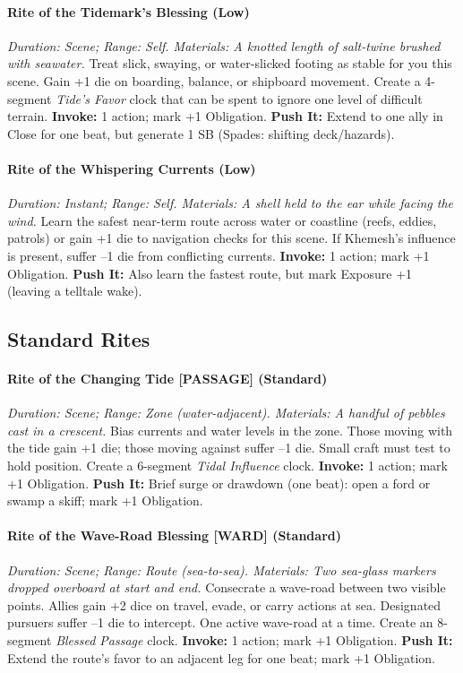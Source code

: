 \paragraph{Rite of the Tidemark's Blessing (Low)}  
\emph{Duration: Scene; Range: Self. Materials: A knotted length of salt-twine brushed with seawater.}  
Treat slick, swaying, or water-slicked footing as stable for you this scene. Gain +1 die on boarding, balance, or shipboard movement. Create a 4-segment \emph{Tide's Favor} clock that can be spent to ignore one level of difficult terrain.  
\textbf{Invoke:} 1 action; mark +1 Obligation.  
\textbf{Push It:} Extend to one ally in Close for one beat, but generate 1 SB (Spades: shifting deck/hazards).

\paragraph{Rite of the Whispering Currents (Low)}  
\emph{Duration: Instant; Range: Self. Materials: A shell held to the ear while facing the wind.}  
Learn the safest near-term route across water or coastline (reefs, eddies, patrols) or gain +1 die to navigation checks for this scene. If Khemesh's influence is present, suffer --1 die from conflicting currents.  
\textbf{Invoke:} 1 action; mark +1 Obligation.  
\textbf{Push It:} Also learn the fastest route, but mark Exposure +1 (leaving a telltale wake).

\subsection*{Standard Rites}
\paragraph{Rite of the Changing Tide [PASSAGE] (Standard)}  
\emph{Duration: Scene; Range: Zone (water-adjacent). Materials: A handful of pebbles cast in a crescent.}  
Bias currents and water levels in the zone. Those moving with the tide gain +1 die; those moving against suffer --1 die. Small craft must test to hold position. Create a 6-segment \emph{Tidal Influence} clock.  
\textbf{Invoke:} 1 action; mark +1 Obligation.  
\textbf{Push It:} Brief surge or drawdown (one beat): open a ford or swamp a skiff; mark +1 Obligation.

\paragraph{Rite of the Wave-Road Blessing [WARD] (Standard)}  
\emph{Duration: Scene; Range: Route (sea-to-sea). Materials: Two sea-glass markers dropped overboard at start and end.}  
Consecrate a wave-road between two visible points. Allies gain +2 dice on travel, evade, or carry actions at sea. Designated pursuers suffer --1 die to intercept. One active wave-road at a time. Create an 8-segment \emph{Blessed Passage} clock.  
\textbf{Invoke:} 1 action; mark +1 Obligation.  
\textbf{Push It:} Extend the route's favor to an adjacent leg for one beat; mark +1 Obligation.

